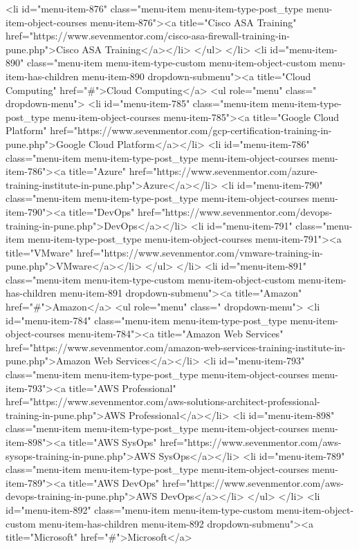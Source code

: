 {<li id="menu-item-876" class="menu-item menu-item-type-post_type menu-item-object-courses menu-item-876"><a title="Cisco ASA Training" href="https://www.sevenmentor.com/cisco-asa-firewall-training-in-pune.php">Cisco ASA Training</a></li>
</ul>
</li>
<li id="menu-item-890" class="menu-item menu-item-type-custom menu-item-object-custom menu-item-has-children menu-item-890 dropdown-submenu"><a title="Cloud Computing" href="#">Cloud Computing</a>
<ul role="menu" class=" dropdown-menu">
<li id="menu-item-785" class="menu-item menu-item-type-post_type menu-item-object-courses menu-item-785"><a title="Google Cloud Platform" href="https://www.sevenmentor.com/gcp-certification-training-in-pune.php">Google Cloud Platform</a></li>
<li id="menu-item-786" class="menu-item menu-item-type-post_type menu-item-object-courses menu-item-786"><a title="Azure" href="https://www.sevenmentor.com/azure-training-institute-in-pune.php">Azure</a></li>
<li id="menu-item-790" class="menu-item menu-item-type-post_type menu-item-object-courses menu-item-790"><a title="DevOps" href="https://www.sevenmentor.com/devops-training-in-pune.php">DevOps</a></li>
<li id="menu-item-791" class="menu-item menu-item-type-post_type menu-item-object-courses menu-item-791"><a title="VMware" href="https://www.sevenmentor.com/vmware-training-in-pune.php">VMware</a></li>
</ul>
</li>
<li id="menu-item-891" class="menu-item menu-item-type-custom menu-item-object-custom menu-item-has-children menu-item-891 dropdown-submenu"><a title="Amazon" href="#">Amazon</a>
<ul role="menu" class=" dropdown-menu">
<li id="menu-item-784" class="menu-item menu-item-type-post_type menu-item-object-courses menu-item-784"><a title="Amazon Web Services" href="https://www.sevenmentor.com/amazon-web-services-training-institute-in-pune.php">Amazon Web Services</a></li>
<li id="menu-item-793" class="menu-item menu-item-type-post_type menu-item-object-courses menu-item-793"><a title="AWS Professional" href="https://www.sevenmentor.com/aws-solutions-architect-professional-training-in-pune.php">AWS Professional</a></li>
<li id="menu-item-898" class="menu-item menu-item-type-post_type menu-item-object-courses menu-item-898"><a title="AWS SysOps" href="https://www.sevenmentor.com/aws-sysops-training-in-pune.php">AWS SysOps</a></li>
<li id="menu-item-789" class="menu-item menu-item-type-post_type menu-item-object-courses menu-item-789"><a title="AWS DevOps" href="https://www.sevenmentor.com/aws-devops-training-in-pune.php">AWS DevOps</a></li>
</ul>
</li>
<li id="menu-item-892" class="menu-item menu-item-type-custom menu-item-object-custom menu-item-has-children menu-item-892 dropdown-submenu"><a title="Microsoft" href="#">Microsoft</a>
}
